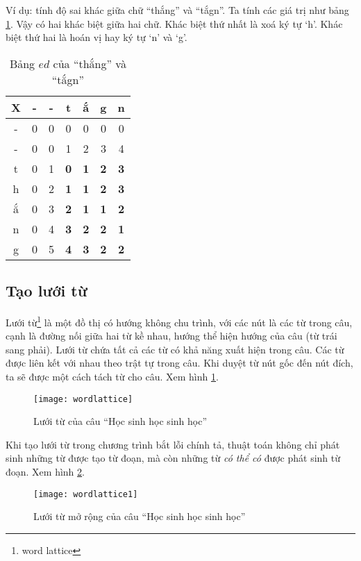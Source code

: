 \documentclass[a4paper,oneside]{book} %
\begin{document}
Ví dụ: tính độ sai khác giữa chữ ``thắng'' và ``tắgn''. Ta tính các
giá trị như bảng \ref{tab:ed-example}. Vậy có hai khác biệt giữa hai
chữ. Khác biệt thứ nhất là xoá ký tự `h'. Khác biệt thứ hai là hoán vị
hay ký tự `n' và `g'.

\begin{table}[htbp]
  \centering
  \begin{tabular}{|c|c|c|c|c|c|c|}
    \hline
    X&-&-&t&ắ&g&n\\\hline
    -&0&0&0&0&0&0\\\hline
    -&0&0&1&2&3&4\\\hline
    t&0&1&\bf 0&\bf 1&\bf 2&\bf 3\\\hline
    h&0&2&\bf 1&\bf 1&\bf 2&\bf 3\\\hline
    ắ&0&3&\bf 2&\bf 1&\bf 1&\bf 2\\\hline
    n&0&4&\bf 3&\bf 2&\bf 2&\bf 1\\\hline
    g&0&5&\bf 4&\bf 3&\bf 2&\bf 2\\\hline
  \end{tabular}
  \caption{Bảng $ed$ của ``thắng'' và ``tắgn''}
  \label{tab:ed-example}
\end{table}

\subsection{Tạo lưới từ}
\label{sub:lattice}
Lưới từ\footnote{word lattice} là một đồ thị có hướng không chu trình,
với các nút là các từ trong câu, cạnh là đường nối giữa hai từ kề
nhau, hướng thể hiện hướng của câu (từ trái sang phải). Lưới từ
chứa tất cả 
các từ có khả năng xuất hiện trong câu. Các từ được liên kết với nhau
theo trật tự trong câu. Khi duyệt từ nút gốc đến nút đích, ta sẽ được
một cách tách từ cho câu. Xem hình \ref{fig:wordlattice}.

\begin{figure}[htbp]
  \centering
  \texttt{[image: wordlattice]}
  \caption{Lưới từ của câu ``Học sinh học sinh học''}
  \label{fig:wordlattice}
\end{figure}

Khi tạo lưới từ trong chương trình bắt lỗi chính tả, thuật toán không
chỉ phát sinh những từ được tạo từ đoạn, mà còn những từ {\em có thể
có} được phát sinh từ đoạn. Xem hình \ref{fig:wordlattice1}.

\begin{figure}[htbp]
  \centering
  \texttt{[image: wordlattice1]}
  \caption{Lưới từ mở rộng của câu ``Học sinh học sinh học''}
  \label{fig:wordlattice1}
\end{figure}
\end{document}
